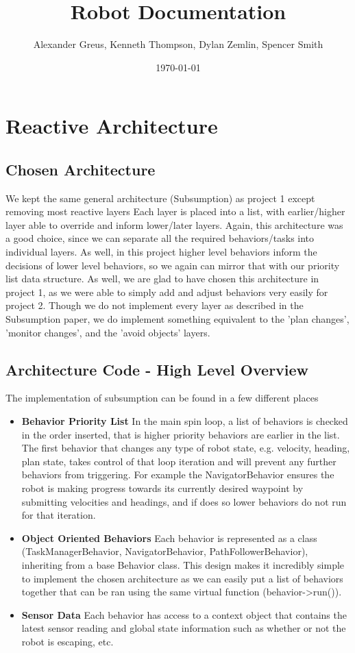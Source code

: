 \documentclass[12pt]{article}
\title{Robot Documentation}
\author{Alexander Greus, Kenneth Thompson, Dylan Zemlin, Spencer Smith}
\date{\today}
\begin{document}
\maketitle

\section{Reactive Architecture}

\subsection{Chosen Architecture}
We kept the same general architecture (Subsumption) as project 1 except removing most reactive layers Each layer is placed into a list, with earlier/higher layer able to override and inform lower/later layers. Again, this architecture was a good choice, since we can separate all the required behaviors/tasks into individual layers. As well, in this project higher level behaviors inform the decisions of lower level behaviors, so we again can mirror that with our priority list data structure. As well, we are glad to have chosen this architecture in project 1, as we were able to simply add and adjust behaviors very easily for project 2. Though we do not implement every layer as described in the Subsumption paper, we do implement something equivalent to the 'plan changes', 'monitor changes', and the 'avoid objects' layers.

\subsection{Architecture Code - High Level Overview}
The implementation of subsumption can be found in a few different places
\begin{itemize}
    \item \textbf{Behavior Priority List} In the main spin loop, a list of behaviors is checked in the order inserted, that is higher priority behaviors are earlier in the list. The first behavior that changes any type of robot state, e.g. velocity, heading, plan state, takes control of that loop iteration and will prevent any further behaviors from triggering. For example the NavigatorBehavior ensures the robot is making progress towards its currently desired waypoint by submitting velocities and headings, and if does so lower behaviors do not run for that iteration.
    \item \textbf{Object Oriented Behaviors} Each behavior is represented as a class (TaskManagerBehavior, NavigatorBehavior, PathFollowerBehavior), inheriting from a base Behavior class. This design makes it incredibly simple to implement the chosen architecture as we can easily put a list of behaviors together that can be ran using the same virtual function (behavior->run()).
    \item \textbf{Sensor Data} Each behavior has access to a context object that contains the latest sensor reading and global state information such as whether or not the robot is escaping, etc.
\end{itemize}
\end{document}
